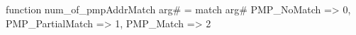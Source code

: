 function num_of_pmpAddrMatch arg# = match arg# {
  PMP_NoMatch => 0,
  PMP_PartialMatch => 1,
  PMP_Match => 2
}
